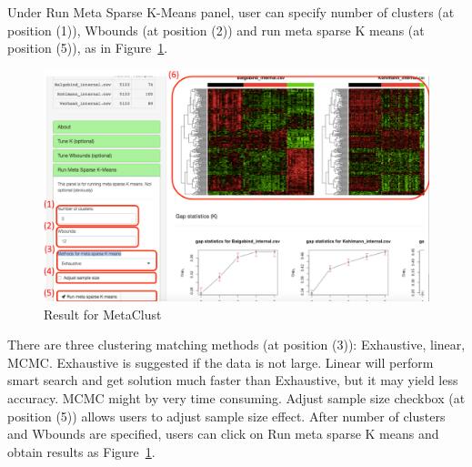 \begin{steps}
Under Run Meta Sparse K-Means panel,
user can specify number of clusters (at position {\color{red} (1)}), Wbounds (at position {\color{red} (2)}) and run meta sparse K means (at position {\color{red} (5)}), 
as in Figure~\ref{fig:mskmRes}.
\begin{figure}[H]
\begin{center}
\includegraphics[scale=0.4]{./figure/metaClust/mskmRes}
\caption{Result for MetaClust}
\label{fig:mskmRes}
\end{center}
\end{figure}
There are three clustering matching methods (at position {\color{red} (3)}): Exhaustive, linear, MCMC.
Exhaustive is suggested if the data is not large.
Linear will perform smart search and get solution much faster than Exhaustive, 
but it may yield less accuracy.
MCMC might by very time consuming.
Adjust sample size checkbox (at position {\color{red} (5)}) allows users to adjust sample size effect.
After number of clusters and Wbounds are specified,
users can click on Run meta sparse K means and obtain results as Figure~\ref{fig:mskmRes}.

\end{steps}

